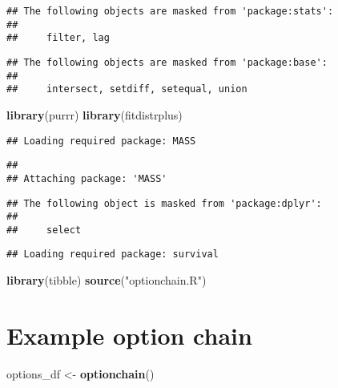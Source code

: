 \documentclass[
]{article}
\newenvironment{Shaded}{\begin{snugshade}}{\end{snugshade}}
\newcommand{\FunctionTok}[1]{\textcolor[rgb]{0.13,0.29,0.53}{\textbf{#1}}}
\newcommand{\NormalTok}[1]{#1}
\newcommand{\OtherTok}[1]{\textcolor[rgb]{0.56,0.35,0.01}{#1}}
\newcommand{\StringTok}[1]{\textcolor[rgb]{0.31,0.60,0.02}{#1}}
\begin{document}
\begin{verbatim}
## The following objects are masked from 'package:stats':
## 
##     filter, lag
\end{verbatim}

\begin{verbatim}
## The following objects are masked from 'package:base':
## 
##     intersect, setdiff, setequal, union
\end{verbatim}

\begin{Shaded}
\begin{Highlighting}[]
\FunctionTok{library}\NormalTok{(purrr)}
\FunctionTok{library}\NormalTok{(fitdistrplus)}
\end{Highlighting}
\end{Shaded}

\begin{verbatim}
## Loading required package: MASS
\end{verbatim}

\begin{verbatim}
## 
## Attaching package: 'MASS'
\end{verbatim}

\begin{verbatim}
## The following object is masked from 'package:dplyr':
## 
##     select
\end{verbatim}

\begin{verbatim}
## Loading required package: survival
\end{verbatim}

\begin{Shaded}
\begin{Highlighting}[]
\FunctionTok{library}\NormalTok{(tibble)}
\FunctionTok{source}\NormalTok{(}\StringTok{"optionchain.R"}\NormalTok{)}
\end{Highlighting}
\end{Shaded}

\section{Example option chain}\label{example-option-chain}

\begin{Shaded}
\begin{Highlighting}[]
\NormalTok{options\_df }\OtherTok{\textless{}{-}} \FunctionTok{optionchain}\NormalTok{()}
\end{Highlighting}
\end{Shaded}
\end{document}
